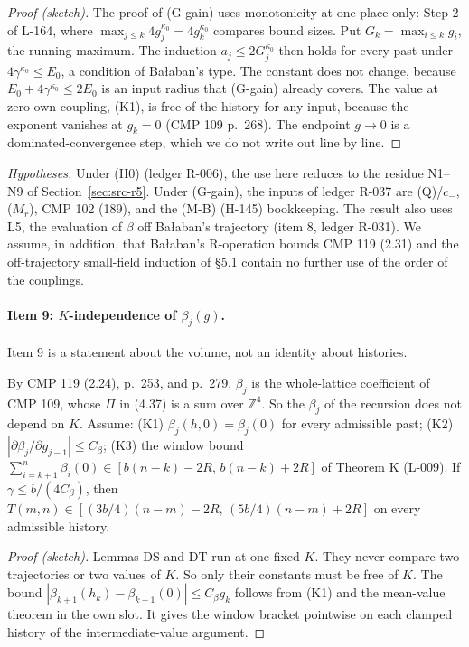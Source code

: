 \begin{proof}[Proof (sketch)]
The proof of (G-gain) uses monotonicity at one place only: Step 2 of L-164, where $\max_{j\le k}4g_j^{\kappa_0}=4g_k^{\kappa_0}$ compares bound sizes. Put $G_k=\max_{i\le k}g_i$, the running maximum. The induction $a_j\le2G_j^{\kappa_0}$ then holds for every past under $4\gamma^{\kappa_0}\le E_0$, a condition of Ba{\l}aban's type. The constant does not change, because $E_0+4\gamma^{\kappa_0}\le2E_0$ is an input radius that (G-gain) already covers. The value at zero own coupling, (K1), is free of the history for any input, because the exponent vanishes at $g_k=0$ (CMP 109 p.~268). The endpoint $g\to0$ is a dominated-convergence step, which we do not write out line by line.
\end{proof}

\emph{Hypotheses.} Under (H0) (ledger R-006), the use here reduces to the residue N1--N9 of Section~\ref{sec:src-r5}. Under (G-gain), the inputs of ledger R-037 are (Q)/$c_-$, ($M_r$), CMP 102 (189), and the (M-B) (H-145) bookkeeping. The result also uses L5, the evaluation of $\beta$ off Ba{\l}aban's trajectory (item 8, ledger R-031). We assume, in addition, that Ba{\l}aban's R-operation bounds CMP 119 (2.31) and the off-trajectory small-field induction of  \S5.1 contain no further use of the order of the couplings.

\paragraph{Item 9: $K$-independence of $\beta_j(g)$.}
Item 9 is a statement about the volume, not an identity about histories.

\begin{proposition}\label{src:T2-KUNIF}
By CMP 119 (2.24), p.~253, and p.~279, $\beta_j$ is the whole-lattice coefficient of CMP 109, whose $\Pi$ in (4.37) is a sum over $\mathbb Z^4$. So the $\beta_j$ of the recursion does not depend on $K$. Assume:
(K1) $\beta_j(h,0)=\beta_j(0)$ for every admissible past;
(K2) $|\partial\beta_j/\partial g_{j-1}|\le C_\beta$;
(K3) the window bound $\sum_{i=k+1}^{n}\beta_i(0)\in[b(n-k)-2R,\,b(n-k)+2R]$ of Theorem K (L-009).
If $\gamma\le b/(4C_\beta)$, then $T(m,n)\in[(3b/4)(n-m)-2R,\,(5b/4)(n-m)+2R]$ on every admissible history.
\end{proposition}

\begin{proof}[Proof (sketch)]
Lemmas DS and DT run at one fixed $K$. They never compare two trajectories or two values of $K$. So only their constants must be free of $K$. The bound $|\beta_{k+1}(h_k)-\beta_{k+1}(0)|\le C_\beta g_k$ follows from (K1) and the mean-value theorem in the own slot. It gives the window bracket pointwise on each clamped history of the intermediate-value argument.
\end{proof}

